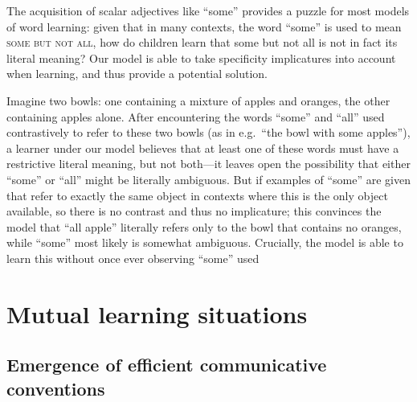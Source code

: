 \documentclass{article} %
\begin{document}

The acquisition of scalar adjectives like ``some'' provides a puzzle
for most models of word learning: given that in many contexts, the
word ``some'' is used to mean \textsc{some but not all}, how do
children learn that {\sc some but not all} is not in fact its literal meaning? Our model
is able to take specificity implicatures into account when learning,
and thus provide a potential solution. 

Imagine two bowls: one
containing a mixture of apples and oranges, the other containing
apples alone. After encountering the words ``some'' and ``all'' used contrastively
to refer to these two bowls (as in e.g.\ ``the bowl with some
apples''), a learner under our model believes that at least one of these words must have a
restrictive literal meaning, but not both---it leaves open the
possibility that either ``some'' or ``all'' might be literally
ambiguous. But if examples of ``some'' are given that refer to exactly
the same object in contexts where this is the only object
available, so there is no contrast and thus no implicature; this
convinces the model that ``all apple'' literally refers only to the
bowl that contains no oranges, while ``some'' most likely is somewhat
ambiguous. Crucially, the model is able to learn this without once
ever observing ``some'' used

\section{Mutual learning situations}

\subsection{Emergence of efficient communicative conventions}
\end{document}
